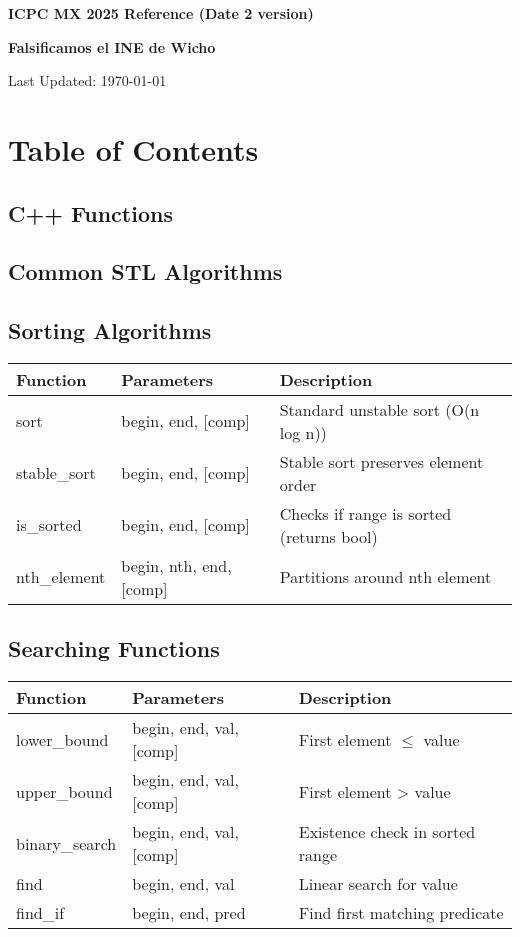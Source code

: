 \documentclass[10pt]{article}
\newcommand{\authorname}{\textbf{Falsificamos el INE de Wicho}} %
\newcommand{\maketitlepage}{
    \begin{titlepage}
        \centering
        \vspace*{2cm}
        {\Huge\bfseries ICPC MX 2025 Reference (Date 2 version)\par}
        \vspace{1cm}
        {\Large \authorname \par} %
        \vspace{2cm}
        {\large Last Updated: \today\par}
        \vfill
    \end{titlepage}
}
\begin{document}
\maketitlepage
\cleardoublepage

\section*{Table of Contents}
\begin{multicols*}{2}
    \startcontents[sections]
\end{multicols*}
\newpage

\begin{multicols*}{2}


\section{C++ Functions}
\subsection{Common STL Algorithms}

\subsection*{Sorting Algorithms}
\begin{tabularx}{\linewidth}{|l|l|X|}
    \hline
    \textbf{Function} & \textbf{Parameters} & \textbf{Description} \\
    \hline
    sort & begin, end, [comp] & Standard unstable sort (O(n log n)) \\
    \hline
    stable\_sort & begin, end, [comp] & Stable sort preserves element order \\
    \hline
    is\_sorted & begin, end, [comp] & Checks if range is sorted (returns bool) \\
    \hline
    nth\_element & begin, nth, end, [comp] & Partitions around nth element \\
    \hline
\end{tabularx}

\subsection*{Searching Functions}
\begin{tabularx}{\linewidth}{|l|l|X|}
    \hline
    \textbf{Function} & \textbf{Parameters} & \textbf{Description} \\
    \hline
    lower\_bound & begin, end, val, [comp] & First element $\leq$ value \\
    \hline
    upper\_bound & begin, end, val, [comp] & First element > value \\
    \hline
    binary\_search & begin, end, val, [comp] & Existence check in sorted range \\
    \hline
    find & begin, end, val & Linear search for value \\
    \hline
    find\_if & begin, end, pred & Find first matching predicate \\
    \hline
\end{tabularx}


\end{multicols*}
\end{document}
